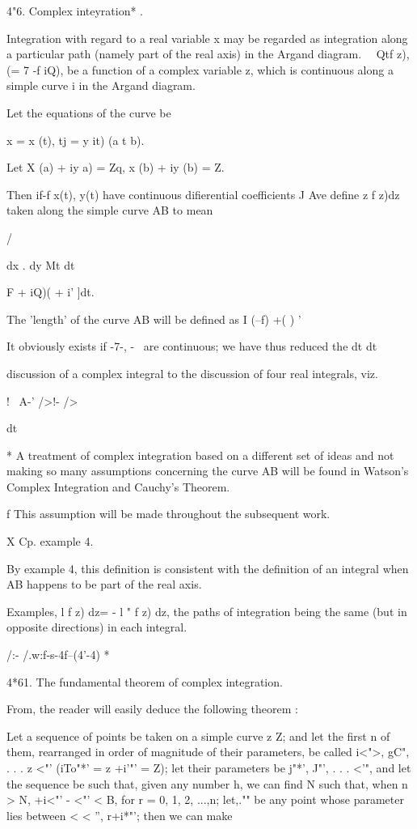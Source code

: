 4"6. Complex inteyration* .

Integration with regard to a real variable x may be regarded as
integration along a particular path (namely part of the real axis) in
the Argand diagram. \ \ Qtf z), (= 7 -f iQ), be a function of a
complex variable z, which is continuous along a simple curve i in the
Argand diagram.

Let the equations of the curve be

x = x (t), tj = y it) (a t b).

Let X (a) + iy a) = Zq, x (b) + iy (b) = Z.

Then if-f x(t), y(t) have continuous difierential coefficients J Ave
define z f z)dz taken along the simple curve AB to mean

/

dx . dy Mt dt

 F + iQ)( + i' ]dt.

The 'length' of the curve AB will be defined as I \/ (--f) +( ) ' 

It obviously exists if -7-, -~ are continuous; we have thus reduced
the  dt dt

discussion of a complex integral to the discussion of four real
integrals, viz.

! \ A-' />!- />

dt

* A treatment of complex integration based on a different set of ideas
and not making so many assumptions concerning the curve AB will be
found in Watson's Complex Integration and Cauchy's Theorem.

f This assumption will be made throughout the subsequent work.

X Cp. example 4.

%
%

By example 4, this definition is consistent with the definition
of an integral when AB happens to be part of the real axis.

Examples, l f z) dz= - l " f z) dz, the paths of integration being the
same (but in opposite directions) in each integral.

/:- /.w:f-s-4f--(4'-4) *\

4*61. The fundamental theorem of complex integration.

From, the reader will easily deduce the following theorem :

Let a sequence of points be taken on a simple curve z Z; and let the
first n of them, rearranged in order of magnitude of their parameters,
be called i<">, gC", . . . z <"' (iTo"*' = z +i'"' = Z); let their
parameters be j"*', J"', . . . <'", and let the sequence be such that,
given any number h, we can find N such that, when n > N, +i<"' - <"' <
B, for r = 0, 1, 2, ...,n; let,."" be any point whose parameter lies
between < < '', r+i*"'; then we can make

